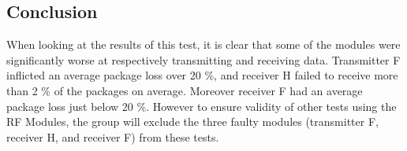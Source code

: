 \subsection{Conclusion}
When looking at the results of this test, it is clear that some of the modules were significantly worse at respectively transmitting and receiving data.
Transmitter \textsf{F} inflicted an average package loss over 20 \%, and receiver \textsf{H} failed to receive more than 2 \% of the packages on average.
Moreover receiver \textsf{F} had an average package loss just below 20 \%.
However to ensure validity of other tests using the RF Modules, the group will exclude the three faulty modules (transmitter \textsf{F}, receiver \textsf{H}, and receiver \textsf{F}) from these tests.